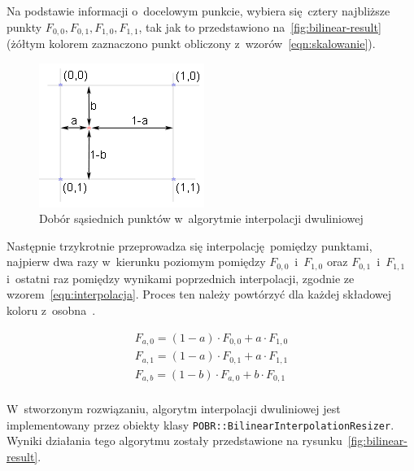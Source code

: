 Na podstawie informacji o~docelowym punkcie, wybiera się cztery najbliższe punkty $F_{0,0}, F_{0,1}, F_{1,0}, F_{1,1}$, tak jak to przedstawiono na~\ref{fig:bilinear-result} (żółtym kolorem zaznaczono punkt obliczony z~wzorów~\ref{eqn:skalowanie}). 

\begin{figure}[h]
    \centering
    \includegraphics[width=0.6\columnwidth]{figures/bi2.png}
    \caption{Dobór sąsiednich punktów w~algorytmie interpolacji dwuliniowej~\cite{algorytmy:bilinear}}
    \label{fig:bilinear-example}
\end{figure}

Następnie trzykrotnie przeprowadza się interpolację pomiędzy punktami, najpierw dwa razy w~kierunku poziomym pomiędzy $F_{0,0}$~i~$F_{1,0}$ oraz $F_{0,1}$~i~$F_{1,1}$ i~ostatni raz pomiędzy wynikami poprzednich interpolacji, zgodnie ze wzorem~\ref{eqn:interpolacja}. Proces ten należy powtórzyć dla każdej składowej koloru z~osobna~\cite{algorytmy:bilinear}.

\begin{equation}
    \label{eqn:interpolacja}
    \begin{array}{l}
        F_{a,0} = (1-a) \cdot F_{0,0} + a \cdot F_{1,0} \\
        F_{a,1} = (1-a) \cdot F_{0,1} + a \cdot F_{1,1} \\
        F_{a,b} = (1-b) \cdot F_{a,0} + b \cdot F_{0,1} \\
    \end{array} 
\end{equation}

W~stworzonym rozwiązaniu, algorytm interpolacji dwuliniowej jest implementowany przez  obiekty klasy \texttt{POBR::BilinearInterpolationResizer}. Wyniki działania tego algorytmu zostały przedstawione na rysunku~\ref{fig:bilinear-result}.

